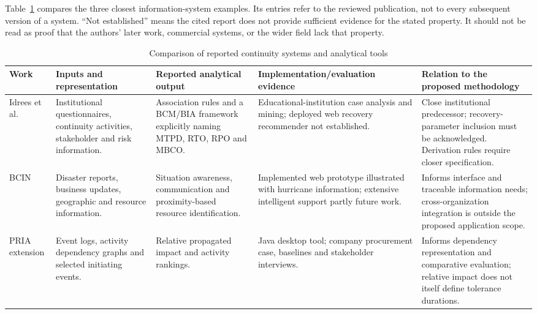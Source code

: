 Table~\ref{tab:system-comparison} compares the three closest information-system examples. Its entries refer to the reviewed publication, not to every subsequent version of a system. ``Not established'' means the cited report does not provide sufficient evidence for the stated property. It should not be read as proof that the authors' later work, commercial systems, or the wider field lack that property.

\begin{table}
\centering
\caption{Comparison of reported continuity systems and analytical tools}
\label{tab:system-comparison}
\begin{spacing}{1}
\small
\setlength{\tabcolsep}{5pt}
\begin{tabularx}{\textheight}{@{}>{\raggedright\arraybackslash}p{2.5cm}*{4}{>{\raggedright\arraybackslash}X}@{}}
\toprule
Work & Inputs and representation & Reported analytical output & Implementation/evaluation evidence & Relation to the proposed methodology \\
\midrule
Idrees et al. \cite{idrees2019bcis} & Institutional questionnaires, continuity activities, stakeholder and risk information. & Association rules and a BCM/BIA framework explicitly naming MTPD, RTO, RPO and MBCO. & Educational-institution case analysis and mining; deployed web recovery recommender not established. & Close institutional predecessor; recovery-parameter inclusion must be acknowledged. Derivation rules require closer specification. \\
\addlinespace
BCIN \cite{saleem2008bcin} & Disaster reports, business updates, geographic and resource information. & Situation awareness, communication and proximity-based resource identification. & Implemented web prototype illustrated with hurricane information; extensive intelligent support partly future work. & Informs interface and traceable information needs; cross-organization integration is outside the proposed application scope. \\
\addlinespace
PRIA extension \cite{raptaki2025propagation} & Event logs, activity dependency graphs and selected initiating events. & Relative propagated impact and activity rankings. & Java desktop tool; company procurement case, baselines and stakeholder interviews. & Informs dependency representation and comparative evaluation; relative impact does not itself define tolerance durations. \\
\bottomrule
\end{tabularx}
\end{spacing}
\end{table}

